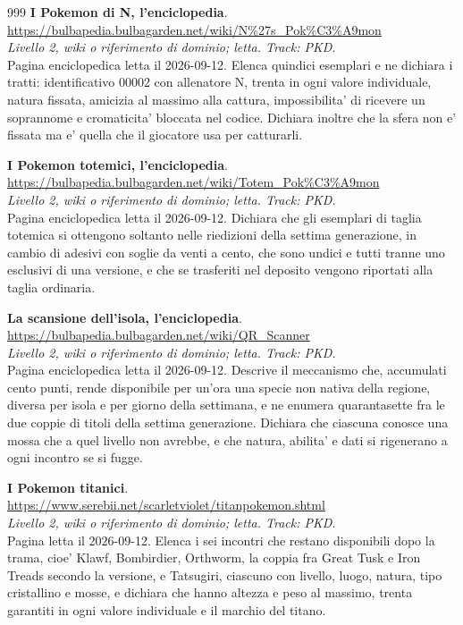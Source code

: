\begin{thebibliography}{999}
  \textbf{I Pokemon di N, l'enciclopedia}.
  \\ \url{https://bulbapedia.bulbagarden.net/wiki/N\%27s_Pok\%C3\%A9mon}
  \\ \emph{Livello 2, wiki o riferimento di dominio; letta. Track: PKD.}
  \\ Pagina enciclopedica letta il 2026-09-12. Elenca quindici esemplari e ne dichiara i tratti: identificativo 00002 con allenatore N, trenta in ogni valore individuale, natura fissata, amicizia al massimo alla cattura, impossibilita' di ricevere un soprannome e cromaticita' bloccata nel codice. Dichiara inoltre che la sfera non e' fissata ma e' quella che il giocatore usa per catturarli.

  \textbf{I Pokemon totemici, l'enciclopedia}.
  \\ \url{https://bulbapedia.bulbagarden.net/wiki/Totem_Pok\%C3\%A9mon}
  \\ \emph{Livello 2, wiki o riferimento di dominio; letta. Track: PKD.}
  \\ Pagina enciclopedica letta il 2026-09-12. Dichiara che gli esemplari di taglia totemica si ottengono soltanto nelle riedizioni della settima generazione, in cambio di adesivi con soglie da venti a cento, che sono undici e tutti tranne uno esclusivi di una versione, e che se trasferiti nel deposito vengono riportati alla taglia ordinaria.

  \textbf{La scansione dell'isola, l'enciclopedia}.
  \\ \url{https://bulbapedia.bulbagarden.net/wiki/QR_Scanner}
  \\ \emph{Livello 2, wiki o riferimento di dominio; letta. Track: PKD.}
  \\ Pagina enciclopedica letta il 2026-09-12. Descrive il meccanismo che, accumulati cento punti, rende disponibile per un'ora una specie non nativa della regione, diversa per isola e per giorno della settimana, e ne enumera quarantasette fra le due coppie di titoli della settima generazione. Dichiara che ciascuna conosce una mossa che a quel livello non avrebbe, e che natura, abilita' e dati si rigenerano a ogni incontro se si fugge.

  \textbf{I Pokemon titanici}.
  \\ \url{https://www.serebii.net/scarletviolet/titanpokemon.shtml}
  \\ \emph{Livello 2, wiki o riferimento di dominio; letta. Track: PKD.}
  \\ Pagina letta il 2026-09-12. Elenca i sei incontri che restano disponibili dopo la trama, cioe' Klawf, Bombirdier, Orthworm, la coppia fra Great Tusk e Iron Treads secondo la versione, e Tatsugiri, ciascuno con livello, luogo, natura, tipo cristallino e mosse, e dichiara che hanno altezza e peso al massimo, trenta garantiti in ogni valore individuale e il marchio del titano.


\end{thebibliography}

